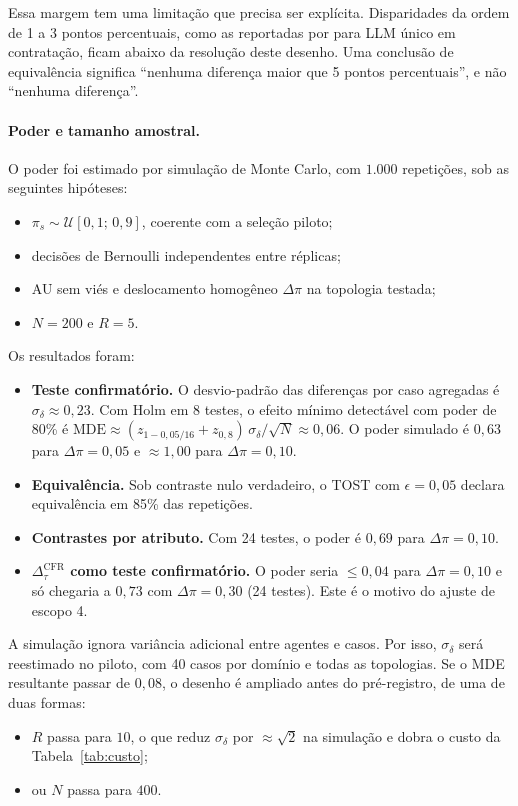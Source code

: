 \documentclass[12pt]{article}
\newcommand{\CFR}{\mathrm{CFR}}
\begin{document}
Essa margem tem uma limitação que precisa ser explícita. Disparidades da ordem de 1 a 3 pontos percentuais, como as reportadas por \citet{an2025resume} para LLM único em contratação, ficam abaixo da resolução deste desenho. Uma conclusão de equivalência significa ``nenhuma diferença maior que 5 pontos percentuais'', e não ``nenhuma diferença''.

\paragraph{Poder e tamanho amostral.} O poder foi estimado por simulação de Monte Carlo, com $1.000$ repetições, sob as seguintes hipóteses:
\begin{itemize}
    \item $\pi_s\sim\mathcal{U}[0{,}1;\,0{,}9]$, coerente com a seleção piloto;
    \item decisões de Bernoulli independentes entre réplicas;
    \item AU sem viés e deslocamento homogêneo $\Delta\pi$ na topologia testada;
    \item $N=200$ e $R=5$.
\end{itemize}
Os resultados foram:
\begin{itemize}
    \item \textbf{Teste confirmatório.} O desvio-padrão das diferenças por caso agregadas é $\sigma_\delta\approx0{,}23$. Com Holm em 8 testes, o efeito mínimo detectável com poder de 80\% é $\mathrm{MDE}\approx(z_{1-0{,}05/16}+z_{0{,}8})\,\sigma_\delta/\sqrt{N}\approx0{,}06$. O poder simulado é $0{,}63$ para $\Delta\pi=0{,}05$ e $\approx1{,}00$ para $\Delta\pi=0{,}10$.
    \item \textbf{Equivalência.} Sob contraste nulo verdadeiro, o TOST com $\epsilon=0{,}05$ declara equivalência em 85\% das repetições.
    \item \textbf{Contrastes por atributo.} Com 24 testes, o poder é $0{,}69$ para $\Delta\pi=0{,}10$.
    \item \textbf{$\Delta^{\CFR}_\tau$ como teste confirmatório.} O poder seria $\le0{,}04$ para $\Delta\pi=0{,}10$ e só chegaria a $0{,}73$ com $\Delta\pi=0{,}30$ (24 testes). Este é o motivo do ajuste de escopo 4.
\end{itemize}
A simulação ignora variância adicional entre agentes e casos. Por isso, $\sigma_\delta$ será reestimado no piloto, com 40 casos por domínio e todas as topologias. Se o MDE resultante passar de $0{,}08$, o desenho é ampliado antes do pré-registro, de uma de duas formas:
\begin{itemize}
    \item $R$ passa para $10$, o que reduz $\sigma_\delta$ por $\approx\sqrt2$ na simulação e dobra o custo da Tabela~\ref{tab:custo};
    \item ou $N$ passa para $400$.
\end{itemize}
\end{document}
